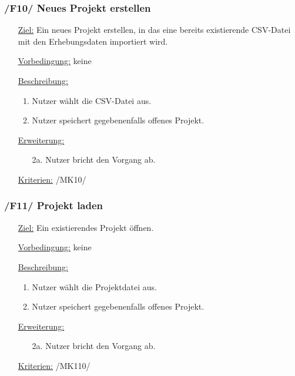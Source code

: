 \documentclass{article}
\begin{document}
\subsubsection*{/F10/ Neues Projekt erstellen}
\begin{itemize}
    \item[\underline{Ziel:}] Ein neues Projekt erstellen, in das eine bereits existierende CSV-Datei mit den Erhebungsdaten importiert wird.
    \item[\underline{Vorbedingung:}] keine
    \item[\underline{Beschreibung:}]
    \begin{enumerate}
        \item Nutzer wählt die CSV-Datei aus.
        \item Nutzer speichert gegebenenfalls offenes Projekt.
    \end{enumerate}
    \item[\underline{Erweiterung:}]
    \begin{itemize}
        \item[2a.] Nutzer bricht den Vorgang ab.
    \end{itemize}
    \item[\underline{Kriterien:}] /MK10/
\end{itemize}

\subsubsection*{/F11/ Projekt laden}
\begin{itemize}
    \item[\underline{Ziel:}] Ein existierendes Projekt öffnen.
    \item[\underline{Vorbedingung:}] keine
    \item[\underline{Beschreibung:}]
    \begin{enumerate}
        \item Nutzer wählt die Projektdatei aus.
        \item Nutzer speichert gegebenenfalls offenes Projekt.
    \end{enumerate}
    \item[\underline{Erweiterung:}]
    \begin{itemize}
        \item[2a.] Nutzer bricht den Vorgang ab.
    \end{itemize}
    \item[\underline{Kriterien:}] /MK110/
\end{itemize}
\end{document}
